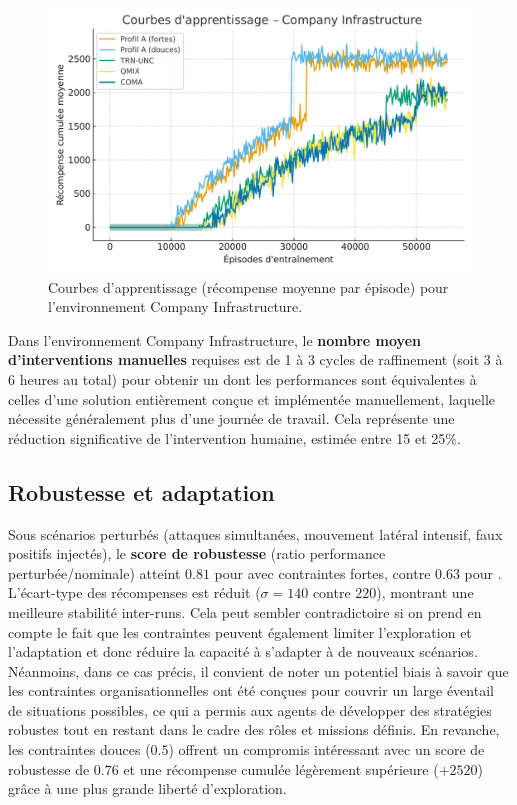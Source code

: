 \begin{figure}[h!]
  \centering
  \includegraphics[width=0.75\linewidth]{figures/results_infra_learning.pdf}
  \caption{Courbes d'apprentissage (récompense moyenne par épisode) pour l'environnement Company Infrastructure.}
  \label{fig:infra_learning_curves}
\end{figure}

Dans l'environnement Company Infrastructure, le \textbf{nombre moyen d'interventions manuelles} requises est de 1 à 3 cycles de raffinement (soit 3 à 6 heures au total) pour obtenir un  dont les performances sont équivalentes à celles d'une solution entièrement conçue et implémentée manuellement, laquelle nécessite généralement plus d'une journée de travail. Cela représente une réduction significative de l'intervention humaine, estimée entre 15 et 25\%.

\subsection*{Robustesse et adaptation}

Sous scénarios perturbés (attaques simultanées, mouvement latéral intensif, faux positifs injectés), le \textbf{score de robustesse} (ratio performance perturbée/nominale) atteint $0.81$ pour  avec contraintes fortes, contre $0.63$ pour .
L'écart-type des récompenses est réduit ($\sigma = 140$ contre $220$), montrant une meilleure stabilité inter-runs. Cela peut sembler contradictoire si on prend en compte le fait que les contraintes peuvent également limiter l'exploration et l'adaptation et donc réduire la capacité à s'adapter à de nouveaux scénarios. Néanmoins, dans ce cas précis, il convient de noter un potentiel biais à savoir que les contraintes organisationnelles ont été conçues pour couvrir un large éventail de situations possibles, ce qui a permis aux agents de développer des stratégies robustes tout en restant dans le cadre des rôles et missions définis.
En revanche, les contraintes douces ($0.5$) offrent un compromis intéressant avec un score de robustesse de $0.76$ et une récompense cumulée légèrement supérieure ($+2520$) grâce à une plus grande liberté d'exploration.

